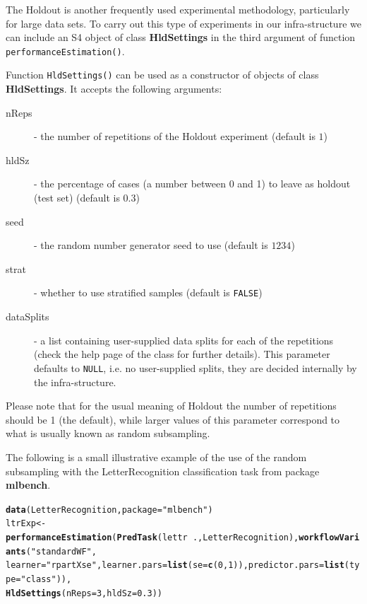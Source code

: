 \documentclass[10pt,a4paper]{article}\usepackage[]{graphicx}\usepackage[]{color}
\makeatletter
\newcommand{\hlnum}[1]{\textcolor[rgb]{0.686,0.059,0.569}{#1}}%
\newcommand{\hlstr}[1]{\textcolor[rgb]{0.192,0.494,0.8}{#1}}%
\newcommand{\hlopt}[1]{\textcolor[rgb]{0,0,0}{#1}}%
\newcommand{\hlstd}[1]{\textcolor[rgb]{0.345,0.345,0.345}{#1}}%
\newcommand{\hlkwb}[1]{\textcolor[rgb]{0.69,0.353,0.396}{#1}}%
\newcommand{\hlkwc}[1]{\textcolor[rgb]{0.333,0.667,0.333}{#1}}%
\newcommand{\hlkwd}[1]{\textcolor[rgb]{0.737,0.353,0.396}{\textbf{#1}}}%
\newenvironment{kframe}{%
 \def\at@end@of@kframe{}%
 \ifinner\ifhmode%
  \def\at@end@of@kframe{\end{minipage}}%
  \begin{minipage}{\columnwidth}%
 \fi\fi%
 \def\FrameCommand##1{\hskip\@totalleftmargin \hskip-\fboxsep
 \colorbox{shadecolor}{##1}\hskip-\fboxsep
     \hskip-\linewidth \hskip-\@totalleftmargin \hskip\columnwidth}%
 \MakeFramed {\advance\hsize-\width
   \@totalleftmargin\z@ \linewidth\hsize
   \@setminipage}}%
 {\par\unskip\endMakeFramed%
 \at@end@of@kframe}
\newenvironment{knitrout}{}{} %
\makeatother
\begin{document}
The Holdout is another frequently used experimental methodology,
particularly for large data sets. To carry out this type of
experiments in our infra-structure we can include an S4 object of
class \textbf{HldSettings} in the third argument of function
\texttt{performanceEstimation()}.

Function \texttt{HldSettings()} can be used as a constructor of
objects of class \textbf{HldSettings}. It accepts the following
arguments:

\begin{description}
\item[nReps] - the number of repetitions of the Holdout experiment (default is $1$)
\item[hldSz] - the percentage  of cases (a number between 0 and 1) to leave as holdout (test set) (default is $0.3$)
\item[seed] - the random number generator seed to use (default is $1234$)
\item[strat] - whether to use stratified samples (default is \texttt{FALSE})
\item[dataSplits] - a list containing user-supplied data splits
  for each of the repetitions (check the help page of the
  class for further details). This parameter defaults to
  \texttt{NULL}, i.e. no user-supplied splits, they are decided
  internally by the infra-structure.
\end{description}

Please note that for the usual meaning of Holdout the number of repetitions should be 1 (the default), while larger values of this parameter correspond to what is usually known as random subsampling.

The following is a small illustrative example of the use of the
random subsampling with the LetterRecognition classification task from package
\textbf{mlbench}.

\begin{knitrout}
\color{fgcolor}\begin{kframe}
\begin{alltt}
\hlkwd{data}\hlstd{(LetterRecognition,} \hlkwc{package} \hlstd{=} \hlstr{"mlbench"}\hlstd{)}
\hlstd{ltrExp} \hlkwb{<-} \hlkwd{performanceEstimation}\hlstd{(}\hlkwd{PredTask}\hlstd{(lettr} \hlopt{~} \hlstd{., LetterRecognition),} \hlkwd{workflowVariants}\hlstd{(}\hlstr{"standardWF"}\hlstd{,}
    \hlkwc{learner} \hlstd{=} \hlstr{"rpartXse"}\hlstd{,} \hlkwc{learner.pars} \hlstd{=} \hlkwd{list}\hlstd{(}\hlkwc{se} \hlstd{=} \hlkwd{c}\hlstd{(}\hlnum{0}\hlstd{,} \hlnum{1}\hlstd{)),} \hlkwc{predictor.pars} \hlstd{=} \hlkwd{list}\hlstd{(}\hlkwc{type} \hlstd{=} \hlstr{"class"}\hlstd{)),}
    \hlkwd{HldSettings}\hlstd{(}\hlkwc{nReps} \hlstd{=} \hlnum{3}\hlstd{,} \hlkwc{hldSz} \hlstd{=} \hlnum{0.3}\hlstd{))}
\end{alltt}
\end{kframe}
\end{knitrout}
\end{document}
